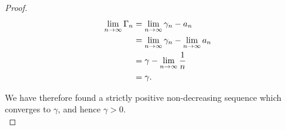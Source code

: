 \begin{proof}
        \begin{align*}
            {\lim_{n \rightarrow \infty}{\Gamma_n}} &= {\lim_{n \rightarrow \infty}{\gamma_n - a_n}} \\
                            &= {\lim_{n \rightarrow \infty}{\gamma_n}} - {\lim_{n \rightarrow \infty}{a_n}} \\
                            &= \gamma - {\lim_{n \rightarrow \infty}{\frac{1}{n}}} \\
                            &= \gamma.
        \end{align*}

        We have therefore found a strictly positive non-decreasing sequence
        which converges to $\gamma$, and hence $\gamma > 0$.
        \\
    \end{proof}
